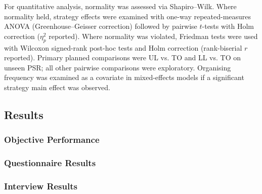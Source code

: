 \documentclass[manuscript,review,anonymous]{acmart}
\begin{document}
For quantitative analysis, normality was assessed via Shapiro--Wilk. Where normality held, strategy effects were examined with one-way repeated-measures ANOVA (Greenhouse--Geisser correction) followed by pairwise $t$-tests with Holm correction ($\eta^2_p$ reported). Where normality was violated, Friedman tests were used with Wilcoxon signed-rank post-hoc tests and Holm correction (rank-biserial $r$ reported). Primary planned comparisons were UL vs. TO and LL vs. TO on unseen PSR; all other pairwise comparisons were exploratory. Organising frequency was examined as a covariate in mixed-effects models if a significant strategy main effect was observed.

\subsection{Results}

\subsubsection{Objective Performance}

\subsubsection{Questionnaire Results}

\subsubsection{Interview Results}
\end{document}
